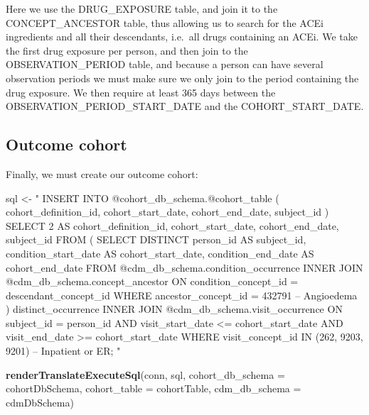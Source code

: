 \documentclass[11pt]{book}
\newenvironment{Shaded}{\begin{snugshade}}{\end{snugshade}}
\newcommand{\DataTypeTok}[1]{\textcolor[rgb]{0.13,0.29,0.53}{#1}}
\newcommand{\KeywordTok}[1]{\textcolor[rgb]{0.13,0.29,0.53}{\textbf{#1}}}
\newcommand{\NormalTok}[1]{#1}
\newcommand{\StringTok}[1]{\textcolor[rgb]{0.31,0.60,0.02}{#1}}
\theoremstyle{definition}
\theoremstyle{definition}
\theoremstyle{definition}
\theoremstyle{remark}
\begin{document}
Here we use the DRUG\_EXPOSURE table, and join it to the CONCEPT\_ANCESTOR table, thus allowing us to search for the ACEi ingredients and all their descendants, i.e.~all drugs containing an ACEi. We take the first drug exposure per person, and then join to the OBSERVATION\_PERIOD table, and because a person can have several observation periods we must make sure we only join to the period containing the drug exposure. We then require at least 365 days between the OBSERVATION\_PERIOD\_START\_DATE and the COHORT\_START\_DATE.

\hypertarget{outcome-cohort}{%
\subsection{Outcome cohort}\label{outcome-cohort}}

Finally, we must create our outcome cohort:

\begin{Shaded}
\begin{Highlighting}[]
\NormalTok{sql <-}\StringTok{ "}
\StringTok{INSERT INTO @cohort_db_schema.@cohort_table (}
\StringTok{ cohort_definition_id,}
\StringTok{ cohort_start_date,}
\StringTok{ cohort_end_date,}
\StringTok{subject_id}
\StringTok{)}
\StringTok{SELECT 2 AS cohort_definition_id,}
\StringTok{  cohort_start_date,}
\StringTok{  cohort_end_date,}
\StringTok{  subject_id}
\StringTok{FROM (}
\StringTok{  SELECT DISTINCT person_id AS subject_id,}
\StringTok{    condition_start_date AS cohort_start_date,}
\StringTok{    condition_end_date AS cohort_end_date}
\StringTok{  FROM @cdm_db_schema.condition_occurrence}
\StringTok{  INNER JOIN @cdm_db_schema.concept_ancestor}
\StringTok{    ON condition_concept_id = descendant_concept_id}
\StringTok{  WHERE ancestor_concept_id = 432791 -- Angioedema}
\StringTok{) distinct_occurrence}
\StringTok{INNER JOIN @cdm_db_schema.visit_occurrence}
\StringTok{  ON subject_id = person_id}
\StringTok{  AND visit_start_date <= cohort_start_date}
\StringTok{  AND visit_end_date >= cohort_start_date}
\StringTok{WHERE visit_concept_id IN (262, 9203,}
\StringTok{    9201) -- Inpatient or ER;}
\StringTok{"}

\KeywordTok{renderTranslateExecuteSql}\NormalTok{(conn, sql,}
                          \DataTypeTok{cohort_db_schema =}\NormalTok{ cohortDbSchema,}
                          \DataTypeTok{cohort_table =}\NormalTok{ cohortTable,}
                          \DataTypeTok{cdm_db_schema =}\NormalTok{ cdmDbSchema)}
\end{Highlighting}
\end{Shaded}
\end{document}
